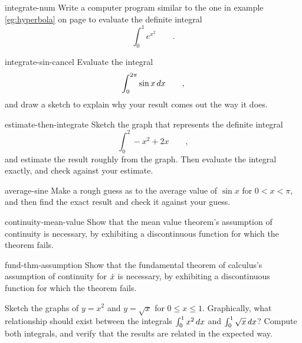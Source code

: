 \begin{hwsection}
\begin{hwwithsoln}{integrate-num}
Write a computer program similar to the one in example \ref{eg:hyperbola} on page \pageref{eg:hyperbola}
to evaluate the definite integral
\begin{equation*}
  \int_0^1 e^{x^2} \qquad .
\end{equation*}
\end{hwwithsoln}

\begin{hwwithsoln}{integrate-sin-cancel}
Evaluate the integral
\begin{equation*}
  \int_0^{2\pi} \sin x \mathop{d\!} x \qquad ,
\end{equation*}
and draw a sketch to explain why your result comes out the way it does.
\end{hwwithsoln}

\begin{hwwithsoln}{estimate-then-integrate}
Sketch the graph that represents the definite integral
\begin{equation*}
  \int_0^2 -x^2+2x \qquad ,
\end{equation*}
and estimate the result roughly from the graph. Then evaluate the
integral exactly, and check against your estimate.
\end{hwwithsoln}

\begin{hwwithsoln}{average-sine}
Make a rough guess as to the average value of $\sin x$ for $0<x<\pi$, and then
find the exact result and check it against your guess.
\end{hwwithsoln}

\begin{hwwithsoln}{continuity-mean-value}
Show that the mean value theorem's assumption of continuity is necessary, by exhibiting
a discontinuous function for which the theorem fails.
\end{hwwithsoln}

\begin{hwwithsoln}{fund-thm-assumption}
Show that the fundamental theorem of calculus's assumption of continuity for $\dot{x}$ is necessary, by exhibiting
a discontinuous function for which the theorem fails.
\end{hwwithsoln}

\begin{hw}
Sketch the graphs of $y=x^2$ and $y=\sqrt{x}$ for $0\le x\le 1$. Graphically, what relationship
should exist between the integrals $\int_0^1 x^2\mathop{d\!} x$ and $\int_0^1 \sqrt{x}\mathop{d\!} x$? Compute both
integrals, and verify that the results are related in the expected way.
\end{hw}


\end{hwsection}
